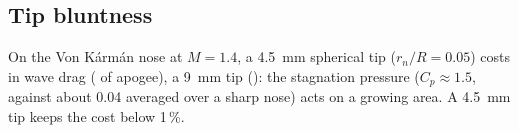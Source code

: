\subsection{Tip bluntness}
\label{sec:bluntness}

On the Von K\'arm\'an nose at $M=1.4$, a \SI{4.5}{mm} spherical tip ($r_n/R=0.05$) costs \BLUNTCOST{} in
wave drag (\BLUNTAPOA{} of apogee), a \SI{9}{mm} tip \BLUNTTEN{} (\BLUNTAPOB{}): the stagnation pressure
($C_p \approx 1.5$, against about 0.04 averaged over a sharp nose) acts on a growing area. A \SI{4.5}{mm}
tip keeps the cost below 1\,\%.
